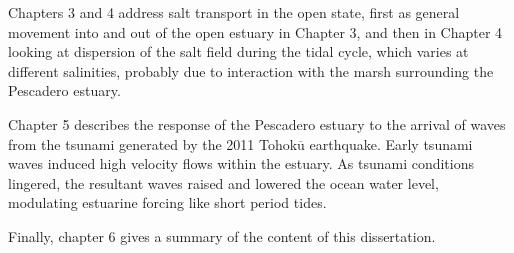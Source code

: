 Chapters 3 and 4 address salt transport in the open state, first as general movement into and out of the open estuary in Chapter 3, and then in Chapter 4 looking at dispersion of the salt field during the tidal cycle, which varies at different salinities, probably due to interaction with the marsh surrounding the Pescadero estuary.

Chapter 5 describes the response of the Pescadero estuary to the arrival of waves from the tsunami generated by the 2011 Tohok$\overline{\mathrm{u}}$ earthquake. Early tsunami waves induced high velocity flows within the estuary. As tsunami conditions lingered, the resultant waves raised and lowered the ocean water level, modulating estuarine forcing like short period tides. 

Finally, chapter 6 gives a summary of the content of this dissertation.







